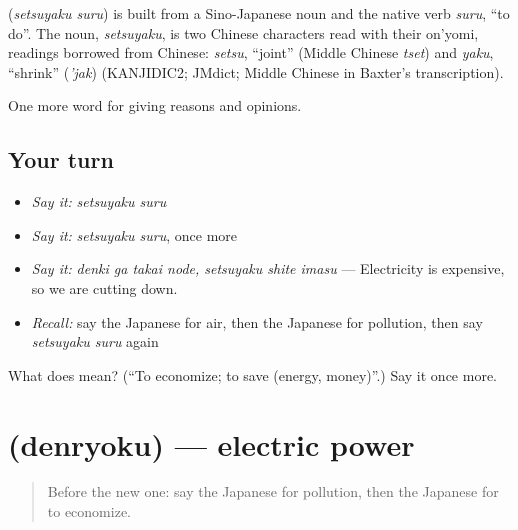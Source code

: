 \begin{cousinweb}
\textbf{} (\emph{setsuyaku suru}) is built from a Sino-Japanese noun and the native verb \emph{suru}, \textquotedblleft{}to do\textquotedblright{}. The noun, \emph{setsuyaku}, is two Chinese characters read with their on'yomi, readings borrowed from Chinese: \emph{setsu}, \textquotedblleft{}joint\textquotedblright{} (Middle Chinese \emph{tset}) and \emph{yaku}, \textquotedblleft{}shrink\textquotedblright{} (\emph{'jak}) (KANJIDIC2; JMdict; Middle Chinese in Baxter's transcription).
\end{cousinweb}

\begin{grammarlens}[title={What you've built}]
One more word for giving reasons and opinions.
\end{grammarlens}

\subsection*{Your turn}
\begin{itemize}
\raggedright
  \item \emph{Say it:} \emph{setsuyaku suru}
  \item \emph{Say it:} \emph{setsuyaku suru}, once more
  \item \emph{Say it:} \emph{denki ga takai node, setsuyaku shite imasu} — Electricity is expensive, so we are cutting down.
  \item \emph{Recall:} say the Japanese for air, then the Japanese for pollution, then say \emph{setsuyaku suru} again
\end{itemize}

\begin{tcolorbox}[breakable,colback=teal!4,colframe=teal!35!black,title={Before you move on}]
What does  mean? (\textquotedblleft{}To economize; to save (energy, money)\textquotedblright{}.) Say it once more.
\end{tcolorbox}
\section[\texorpdfstring{\ja{でんりょく} (denryoku)}{でんりょく (denryoku)}]{ (denryoku) — electric power}

\label{lesson:JA-C337-denryoku}



\begin{quote}
Before the new one: say the Japanese for pollution, then the Japanese for to economize.
\end{quote}

